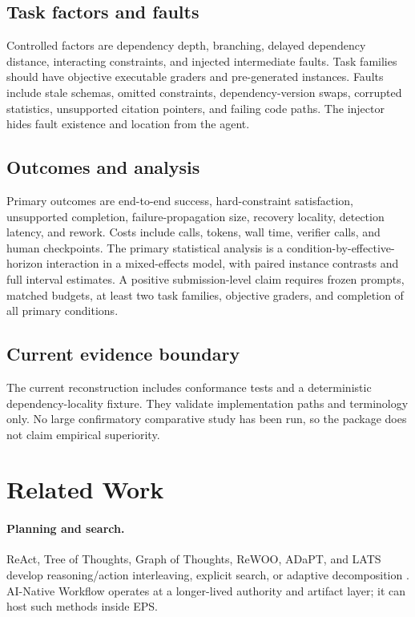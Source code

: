 \documentclass[11pt]{article}
\begin{document}
\subsection{Task factors and faults}
Controlled factors are dependency depth, branching, delayed dependency distance, interacting constraints, and injected intermediate faults. Task families should have objective executable graders and pre-generated instances. Faults include stale schemas, omitted constraints, dependency-version swaps, corrupted statistics, unsupported citation pointers, and failing code paths. The injector hides fault existence and location from the agent.

\subsection{Outcomes and analysis}
Primary outcomes are end-to-end success, hard-constraint satisfaction, unsupported completion, failure-propagation size, recovery locality, detection latency, and rework. Costs include calls, tokens, wall time, verifier calls, and human checkpoints. The primary statistical analysis is a condition-by-effective-horizon interaction in a mixed-effects model, with paired instance contrasts and full interval estimates. A positive submission-level claim requires frozen prompts, matched budgets, at least two task families, objective graders, and completion of all primary conditions.

\subsection{Current evidence boundary}
The current reconstruction includes conformance tests and a deterministic dependency-locality fixture. They validate implementation paths and terminology only. No large confirmatory comparative study has been run, so the package does not claim empirical superiority.

\section{Related Work}
\paragraph{Planning and search.} ReAct, Tree of Thoughts, Graph of Thoughts, ReWOO, ADaPT, and LATS develop reasoning/action interleaving, explicit search, or adaptive decomposition \citep{yao2023react,yao2023tot,besta2024got,xu2023rewoo,prasad2024adapt,zhou2024lats}. AI-Native Workflow operates at a longer-lived authority and artifact layer; it can host such methods inside EPS.
\end{document}
